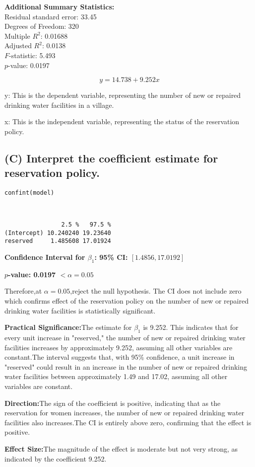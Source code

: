 \documentclass[12pt]{article}
\begin{document}
\textbf{Additional Summary Statistics:} \\
Residual standard error: 33.45 \\
Degrees of Freedom: 320 \\
Multiple \( R^2 \): 0.01688 \\
Adjusted \( R^2 \): 0.0138 \\
\( F \)-statistic: 5.493 \\
\( p \)-value: 0.0197

\[
y = 14.738 + 9.252x
\]

y: This is the dependent variable, representing the number of new or repaired drinking water facilities in a village.

x: This is the independent variable, representing the status of the reservation policy. 

\subsection{(C) Interpret the coefficient estimate for reservation policy.}
\lstset{style=my}
\begin{lstlisting}
confint(model) 
\end{lstlisting}



\begin{verbatim}


                2.5 %   97.5 %
(Intercept) 10.240240 19.23640
reserved     1.485608 17.01924
\end{verbatim}


\textbf{Confidence Interval for \( \beta_1 \): 95\% CI: \( [1.4856, 17.0192] \)}

\textbf{\( p \)-value: 0.0197 \(  < \alpha= 0.05 \)}

Therefore,at \( \alpha = 0.05 \),reject the null hypothesis. The CI does not include zero which confirms effect of the reservation policy on the number of new or repaired drinking water facilities is statistically significant.


\textbf{Practical Significance:}The estimate for \( \beta_1 \) is 9.252. This indicates that for every unit increase in "reserved," the number of new or repaired drinking water facilities increases by approximately 9.252, assuming all other variables are constant.The interval suggests that, with 95\% confidence, a unit increase in "reserved" could result in an increase in the number of new or repaired drinking water facilities between approximately 1.49 and 17.02, assuming all other variables are constant.


\textbf{Direction:}The sign of the coefficient is positive, indicating that as the reservation for women increases, the number of new or repaired drinking water facilities also increases.The CI is entirely above zero, confirming that the effect is positive.

\textbf{Effect Size:}The magnitude of the effect is moderate but not very strong, as indicated by the coefficient 9.252.
\end{document}
